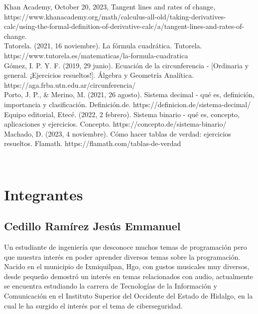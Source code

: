 \documentclass[conference]{IEEEtran}
\begin{document}
\begin{thebibliography}{00}
    Khan Academy, October 20, 2023, Tangent lines and rates of change, https://www.khanacademy.org/math/calculus-all-old/taking-derivatives-calc/using-the-formal-definition-of-derivative-calc/a/tangent-lines-and-rates-of-change.\\
    
    Tutorela. (2021, 16 noviembre). La fórmula cuadrática. Tutorela. https://www.tutorela.es/matematicas/la-formula-cuadratica\\
    
    Gómez, I. P. Y. F. (2019, 29 junio). Ecuación de la circunferencia - [Ordinaria y general. ¡Ejercicios resueltos!]. Álgebra y Geometría Analítica. https://aga.frba.utn.edu.ar/circunferencia/\\

    Porto, J. P., & Merino, M. (2021, 26 agosto). Sistema decimal - qué es, definición, importancia y clasificación. Definición.de. https://definicion.de/sistema-decimal/\\

    Equipo editorial, Etecé. (2022, 2 febrero). Sistema binario - qué es, concepto, aplicaciones y ejercicios. Concepto. https://concepto.de/sistema-binario/\\

    Machado, D. (2023, 4 noviembre). Cómo hacer tablas de verdad: ejercicios resueltos. Flamath. https://flamath.com/tablas-de-verdad\\

\end{thebibliography}
\\

\section{Integrantes}
\subsection{\textbf{Cedillo Ramírez Jesús Emmanuel}}
Un estudiante de ingeniería que desconoce muchos temas de programación pero que muestra interés en poder aprender diversos temas sobre la programación. Nacido en el municipio de Ixmiquilpan, Hgo, con gustos musicales muy diversos, desde pequeño demostró un interés en temas relacionados con audio, actualmente se encuentra estudiando la carrera de Tecnologías de la Información y Comunicación en el Instituto Superior del Occidente del Estado de Hidalgo, en la cual le ha surgido el interés por el tema de ciberseguridad.
\end{document}
